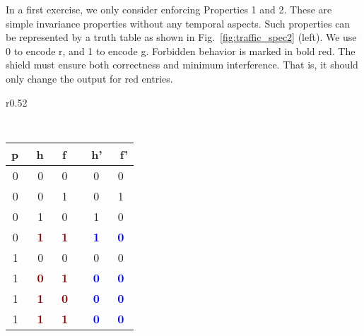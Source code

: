\documentclass{llncs}
\begin{document}
In a first exercise, we only consider enforcing Properties 1 and 2.  
These are simple invariance properties without any temporal aspects.  
Such properties can be represented by a truth table as shown in 
Fig.~\ref{fig:traffic_spec2} (left). We use 0 to encode \textsf{r}, and 
1 to encode \textsf{g}.  Forbidden behavior is marked in bold red.  The 
shield must ensure both correctness and
minimum interference. That is, it should only change the output for red
entries. 
\begin{wrapfigure}[9]{r}{0.52\textwidth}
\vspace{-0.7cm}
\begin{minipage}{0.21\textwidth}
\centering
{\scriptsize \tt
\begin{tabular}{ccc|cc}\hline
    \textsf{p}~ & \textsf{h}~ & \textsf{f}~ & ~\textsf{h'} & 
~\textsf{f'} \\\hline
    0~ & 0~ &  0~ &  ~0 &  0\\ 
    0~ & 0~ &  1~ &  ~0 &  1\\
    0~ & 1~ &  0~ &  ~1 &  0\\
    0~ & \textcolor{darkred}{\bf 1}~ &\textcolor{darkred}{\bf 1}~ & 
~\textcolor{blue}{\bf 1} & \textcolor{blue}{\bf 0}\\
\hline
    1~ & 0~ &  0~ &  ~0 &  0\\ 
    1~ & \textcolor{darkred}{\bf 0}~ &\textcolor{darkred}{\bf 1}~ & 
~\textcolor{blue}{\bf 0} & \textcolor{blue}{\bf 0}\\
    1~ & \textcolor{darkred}{\bf 1}~ &\textcolor{darkred}{\bf 0}~ & 
~\textcolor{blue}{\bf 0} & \textcolor{blue}{\bf 0}\\
    1~ & \textcolor{darkred}{\bf 1}~ &\textcolor{darkred}{\bf 1}~ & 
~\textcolor{blue}{\bf 0} & \textcolor{blue}{\bf 0}\\
\hline
\end{tabular}
}
\end{minipage}


\end{wrapfigure}
\end{document}
